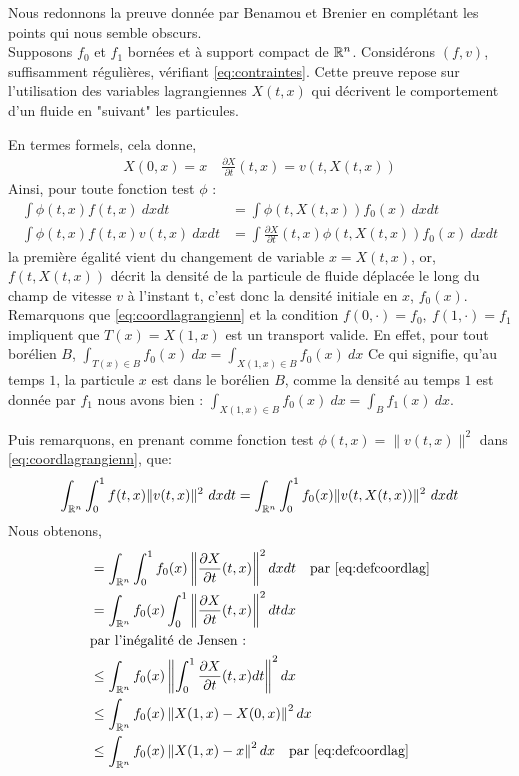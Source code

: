 \documentclass[a4paper,12pt]{article}
\begin{document}
\begin{preuve}
Nous redonnons la preuve donnée par Benamou et Brenier en complétant les points qui nous semble obscurs.\\
Supposons $f_0$ et $f_1$ bornées et à support compact de $\mathbb{R}^n$. Considérons $(f,v)$, suffisamment régulières, vérifiant \eqref{eq:contraintes}. Cette preuve repose sur l'utilisation des variables lagrangiennes $X(t,x)$ qui décrivent le comportement d'un fluide en "suivant" les particules. 




En termes formels, cela donne, 
\begin{align}
X(0,x)=x\quad\frac{\partial X}{\partial t}(t,x) = v(t,X(t,x))
\label{eq:defcoordlag}
\end{align}
Ainsi, pour toute fonction test $\phi$ :
\begin{align}
\int \phi(t,x)f(t,x)\ dxdt &=\int \phi(t,X(t,x))f_0(x)\ dxdt \label{eq:coordlagrangienn}\\ 
\int \phi(t,x)f(t,x)v(t,x)\ dxdt &= \int \frac{\partial X}{\partial t}(t,x)\phi(t,X(t,x))f_0(x)\ dxdt 
\end{align}
la première égalité vient du changement de variable $x=X(t,x)$, or, $f(t,X(t,x))$ décrit la densité de la particule de fluide déplacée le long du champ de vitesse $v$ à l'instant t, c'est donc la densité initiale en $x$, $f_0(x)$. \\

Remarquons que \eqref{eq:coordlagrangienn} et la condition $f(0,\cdot)=f_0,\ f(1,\cdot) = f_1$ impliquent que $T(x)=X(1,x)$ est un transport valide. En effet, pour tout borélien $B$, $\int_{T(x)\in B}f_0(x)\ dx = \int_{X(1,x)\in B}f_0(x)\ dx$ Ce qui signifie, qu'au temps $1$, la particule $x$ est dans le borélien $B$, comme la densité au temps $1$ est donnée par $f_1$ nous avons bien : $\int_{X(1,x)\in B}f_0(x)\ dx = \int_B f_1(x)\ dx$.


Puis remarquons, en prenant comme fonction test $\phi(t,x) = \|v(t,x)\|^2$ dans \eqref{eq:coordlagrangienn}, que: 
$$
\int_{\RR^n}\int_0^1 f(t,x)\|v(t,x)\|^2\ dxdt = \int_{\RR^n}\int_0^1 f_0(x)\|v(t,X(t,x))\|^2\ dxdt
$$
Nous obtenons, 
\begin{align*}
&= \int_{\mathbb{R}^n}\int_0^1  f_0(x)\left\|\frac{\partial X}{\partial t} (t,x)\right\|^2dxdt \quad \text{par } \eqref{eq:defcoordlag}\\
&= \int_{\mathbb{R}^n} f_0(x)\int_0^1 \left\|\frac{\partial X}{\partial t} (t,x)\right\|^2dtdx\\
&\text{par l'inégalité de Jensen : }\\
&\leq \int_{\mathbb{R}^n} f_0(x)\left\|\int_0^1\frac{\partial X}{\partial t} (t,x) dt \right\|^2dx \\
&\leq \int_{\mathbb{R}^n} f_0(x)\left\| X(1,x)-X(0,x) \right\|^2dx \\
&\leq \int_{\mathbb{R}^n} f_0(x)\left\| X(1,x)-x \right\|^2dx  \quad \text{par } \eqref{eq:defcoordlag}\\
\end{align*}


\end{preuve}
\end{document}
